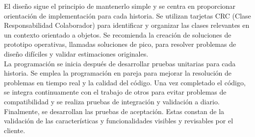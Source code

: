 El diseño sigue el principio de mantenerlo simple y se centra en proporcionar orientación de implementación para cada historia. Se utilizan tarjetas CRC (Clase Responsabilidad Colaborador) para identificar y organizar las clases relevantes en un contexto orientado a objetos. Se recomienda la creación de soluciones de prototipo operativas, llamadas soluciones de pico, para resolver problemas de diseño difíciles y validar estimaciones originales.\\ \indent
La programación se inicia después de desarrollar pruebas unitarias para cada historia. Se emplea la programación en pareja para mejorar la resolución de problemas en tiempo real y la calidad del código. Una vez completado el código, se integra continuamente con el trabajo de otros para evitar problemas de compatibilidad y se realiza pruebas de integración y validación a diario.
Finalmente, se desarrollan las pruebas de aceptación. Estas constan de la validación de las características y funcionalidades visibles y revisables por el cliente. 

